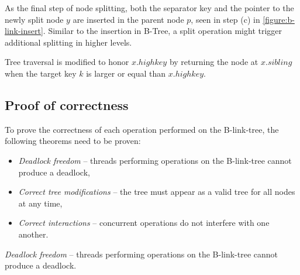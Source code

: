 As the final step of node splitting, both the separator key and the pointer to the newly split node $y$ are inserted in the parent node $p$, seen in step (c) in \cref{figure:b-link-insert}. Similar to the insertion in B-Tree, a split operation might trigger additional splitting in higher levels.

Tree traversal is modified to honor $x.highkey$ by returning the node at $x.sibling$ when the target key $k$ is larger or equal than $x.highkey$.

\subsection{Proof of correctness}

To prove the correctness of each operation performed on the B-link-tree, the following theorems need to be proven:

\begin{itemize}
  \item \textit{Deadlock freedom} -- threads performing operations on the B-link-tree cannot produce a deadlock,
  \item \textit{Correct tree modifications} -- the tree must appear as a valid tree for all nodes at any time,
  \item \textit{Correct interactions} -- concurrent operations do not interfere with one another.
\end{itemize}

\begin{theorem}
  \textit{Deadlock freedom} -- threads performing operations on the B-link-tree cannot produce a deadlock.
\end{theorem}

